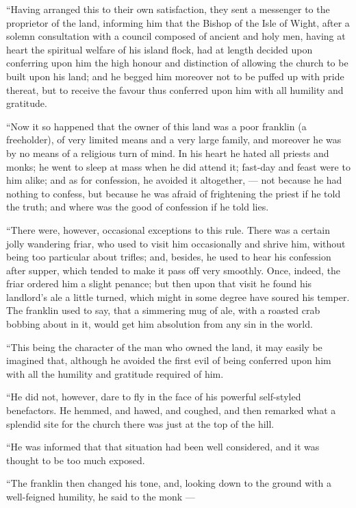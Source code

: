 \documentclass[
  12pt,
  a5paper,
  twoside]{book}
\begin{document}
``Having arranged this to their own satisfaction, they sent a messenger
to the proprietor of the land, informing him that the Bishop of the Isle
of Wight, after a solemn consultation with a council composed of ancient
and holy men, having at heart the spiritual welfare of his island flock,
had at length decided upon conferring upon him the high honour and
distinction of allowing the church to be built upon his land; and he
begged him moreover not to be puffed up with pride thereat, but to
receive the favour thus conferred upon him with all humility and
gratitude.

``Now it so happened that the owner of this land was a poor franklin (a
freeholder), of very limited means and a very large family, and moreover
he was by no means of a religious turn of mind. In his heart he hated
all priests and monks; he went to sleep at mass when he did attend it;
fast-day and feast were to him alike; and as for confession, he avoided
it altogether, --- not because he had nothing to confess, but because he
was afraid of frightening the priest if he told the truth; and where was
the good of confession if he told lies.

``There were, however, occasional exceptions to this rule. There was a
certain jolly wandering friar, who used to visit him occasionally and
shrive him, without being too particular about trifles; and, besides, he
used to hear his confession after supper, which tended to make it pass
off very smoothly. Once, indeed, the friar ordered him a slight penance;
but then upon that visit he found his landlord's ale a little turned,
which might in some degree have soured his temper. The franklin used to
say, that a simmering mug of ale, with a roasted crab bobbing about in
it, would get him absolution from any sin in the world.

``This being the character of the man who owned the land, it may easily
be imagined that, although he avoided the first evil of being conferred
upon him with all the humility and gratitude required of him.

``He did not, however, dare to fly in the face of his powerful
self-styled benefactors. He hemmed, and hawed, and coughed, and then
remarked what a splendid site for the church there was just at the top
of the hill.

``He was informed that that situation had been well considered, and it
was thought to be too much exposed.

``The franklin then changed his tone, and, looking down to the ground
with a well-feigned humility, he said to the monk ---
\end{document}

